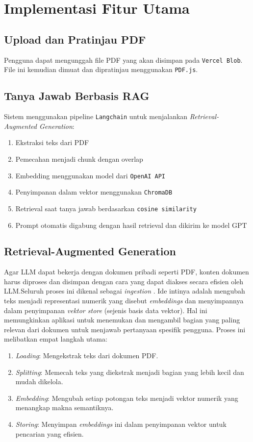 \section{Implementasi Fitur Utama}
\subsection{Upload dan Pratinjau PDF}
Pengguna dapat mengunggah file PDF yang akan disimpan pada \texttt{Vercel Blob}. File ini kemudian dimuat dan dipratinjau menggunakan \texttt{PDF.js}.


\subsection{Tanya Jawab Berbasis RAG}
Sistem menggunakan pipeline \texttt{Langchain} untuk menjalankan \textit{Retrieval-Augmented Generation}:
\begin{enumerate}
  \item Ekstraksi teks dari PDF
  \item Pemecahan menjadi chunk dengan overlap
  \item Embedding menggunakan model dari \texttt{OpenAI API}
  \item Penyimpanan dalam vektor menggunakan \texttt{ChromaDB}
  \item Retrieval saat tanya jawab berdasarkan \texttt{cosine similarity}
  \item Prompt otomatis digabung dengan hasil retrieval dan dikirim ke model GPT
\end{enumerate}

\subsection{Retrieval-Augmented Generation}
Agar LLM dapat bekerja dengan dokumen pribadi seperti PDF, konten dokumen harus diproses dan disimpan dengan cara yang dapat diakses secara efisien oleh LLM.\@ Seluruh proses ini dikenal sebagai \emph{ingestion} \citep[p~.84]{oshin2024learning}. Ide intinya adalah mengubah teks menjadi representasi numerik yang disebut \emph{embeddings} dan menyimpannya dalam penyimpanan \emph{vektor store} (sejenis basis data vektor). Hal ini memungkinkan aplikasi untuk menemukan dan mengambil bagian yang paling relevan dari dokumen untuk menjawab pertanyaan spesifik pengguna. Proses ini melibatkan empat langkah utama:
\begin{enumerate}
  \item \emph{Loading}: Mengekstrak teks dari dokumen PDF.
  \item \emph{Splitting}: Memecah teks yang diekstrak menjadi bagian yang lebih kecil dan mudah dikelola.
  \item \emph{Embedding}: Mengubah setiap potongan teks menjadi vektor numerik yang menangkap makna semantiknya.
  \item \emph{Storing}: Menyimpan \emph{embeddings} ini dalam penyimpanan vektor untuk pencarian yang efisien.
\end{enumerate}

